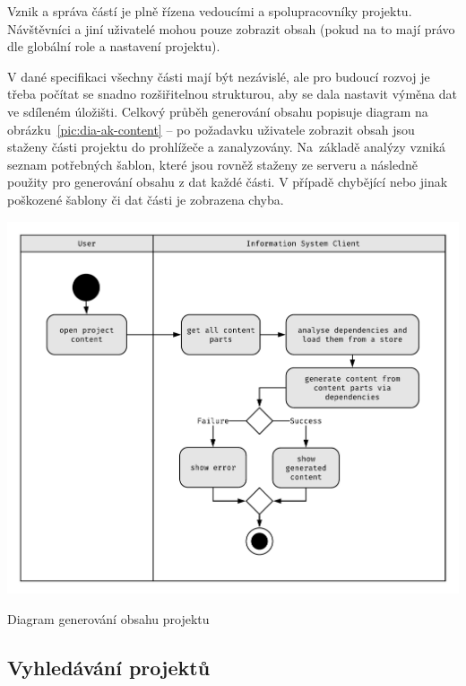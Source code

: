 Vznik a správa částí je plně řízena vedoucími a spolupracovníky projektu. Návštěvníci a jiní uživatelé mohou pouze zobrazit obsah (pokud na to mají právo dle globální role a nastavení projektu).

V dané specifikaci všechny části mají být nezávislé, ale pro budoucí rozvoj je třeba počítat se snadno rozšiřitelnou strukturou, aby se dala nastavit výměna dat ve sdíleném úložišti. Celkový průběh generování obsahu popisuje diagram na obrázku~\ref{pic:dia-ak-content} -- po požadavku uživatele zobrazit obsah jsou staženy části projektu do prohlížeče a zanalyzovány. Na~základě analýzy vzniká seznam potřebných šablon, které jsou rovněž staženy ze serveru a následně použity pro generování obsahu z dat každé části. V případě chybějící nebo jinak poškozené šablony či dat části je zobrazena chyba.

\begin{fig:illustration}
   \includegraphics[width=1\textwidth]{images/dia-ak-content.pdf}
   \caption{Diagram generování obsahu projektu}\label{pic:dia-ak-content}
\end{fig:illustration}




\subsection{Vyhledávání projektů}

